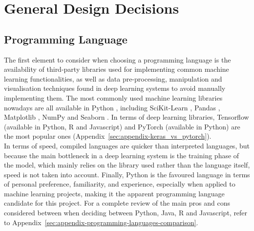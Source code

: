 
\section{General Design Decisions}

\subsection{Programming Language}


The first element to consider when choosing a programming language is the availability of third-party libraries used for implementing common machine learning functionalities, as well as data pre-processing, manipulation and visualisation techniques found in deep learning systems to avoid manually implementing them. The most commonly used machine learning libraries nowadays are all available in Python \citep{raschka2017python}, including SciKit-Learn \citep{scikit-learn}, Pandas \citep{reback2020pandas}, Matplotlib \citep{Hunter:2007}, NumPy \citep{numpy} and Seaborn \citep{seaborn}. In terms of deep learning libraries, Tensorflow (available in Python, R and Javascript) and PyTorch (available in Python) are  the most popular ones (Appendix~\ref{sec:appendix-keras_vs_pytorch}).\\

In terms of speed, compiled languages are quicker than interpreted languages, but because the main bottleneck in a deep learning system is the training phase of the model, which mainly relies on the library used rather than the language itself, speed is not taken into account. Finally, Python is the favoured language in terms of personal preference, familiarity, and experience, especially when applied to machine learning projects, making it the apparent programming language candidate for this project. For a complete review of the main pros and cons considered between when deciding between Python, Java, R and Javascript, refer to Appendix~\ref{sec:appendix-programming-languages-comparison}.

